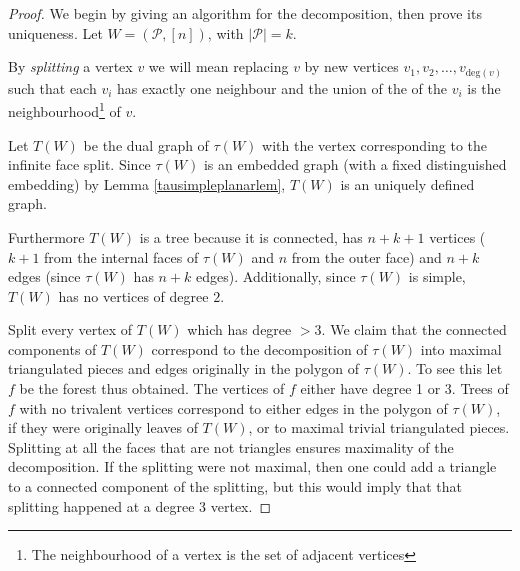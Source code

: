 \documentclass[11pt]{article}
\newcommand{\hlfix}[2]{\texthl{#1}\todo{#2}}
\newcommand{\cP}{\mathcal{P}}
\theoremstyle{remark}
\theoremstyle{definition}
\begin{document}
\begin{proof}
We begin by giving an algorithm for the decomposition, then prove its uniqueness. Let $W = (\cP, [n])$, with $|\cP| = k$.

By \emph{splitting} a vertex $v$ we will mean replacing $v$ by new vertices $v_1, v_2,\ldots, v_{\text{deg}(v)}$ such that each $v_i$ has exactly one neighbour and the union of the of the $v_i$ is the neighbourhood\footnote{The neighbourhood of a vertex is the set of adjacent vertices} of $v$.

Let $T(W)$ be the dual graph of $\tau(W)$ with the vertex corresponding to the infinite face split.
Since $\tau(W)$ is an embedded graph (with a fixed distinguished embedding) by Lemma \ref{tausimpleplanarlem}, $T(W)$ is an uniquely defined graph.

Furthermore $T(W)$ is a tree because it is connected, has $n+k+1$ vertices ($k+1$ from the internal faces of $\tau(W)$ and $n$ from the outer face) and $n+k$ edges (since $\tau(W)$ has $n+k$ edges).  Additionally, since $\tau(W)$ is simple, $T(W)$ has no vertices of degree $2$.  


Split every vertex of $T(W)$ which has degree $>3$.
We claim that the connected components of $T(W)$ correspond to the decomposition of $\tau(W)$ into maximal triangulated pieces and edges originally in the polygon of $\tau(W)$.  To see this let $f$ be the forest thus obtained.
The vertices of $f$ either have degree 1 or 3.
Trees of $f$ with no trivalent vertices correspond to either edges in the polygon of $\tau(W)$, if they were originally leaves of $T(W)$, or to maximal trivial triangulated pieces.
Splitting at all the faces that are not triangles ensures maximality of the decomposition. If the splitting were not maximal, then one could add a triangle to a connected component of the splitting, but this would imply that that splitting happened at a degree $3$ vertex.


\end{proof}
\end{document}
